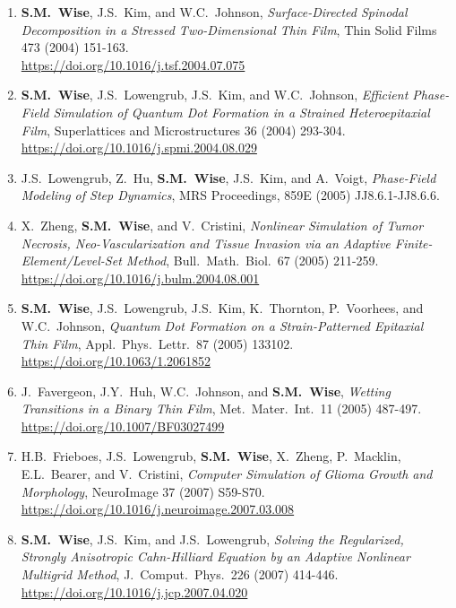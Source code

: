 \documentclass[11pt]{letter}
\begin{document}
\begin{enumerate}
    \item
\textbf{S.M.~Wise}, J.S.~Kim, and W.C.~Johnson, {\sl Surface-Directed Spinodal Decomposition in a Stressed Two-Dimensional Thin Film}, Thin Solid Films 473 (2004) 151-163.
	\\
\url{https://doi.org/10.1016/j.tsf.2004.07.075}

    \item
\textbf{S.M.~Wise}, J.S.~Lowengrub, J.S.~Kim, and W.C.~Johnson, {\sl Efficient Phase-Field Simulation of Quantum Dot Formation in a Strained Heteroepitaxial Film}, Superlattices and Microstructures 36 (2004) 293-304.
	\\
\url{https://doi.org/10.1016/j.spmi.2004.08.029}

    \item
J.S.~Lowengrub, Z.~Hu, \textbf{S.M.~Wise}, J.S.~Kim, and A.~Voigt, {\sl Phase-Field Modeling of Step Dynamics}, MRS Proceedings, 859E (2005) JJ8.6.1-JJ8.6.6.

    \item
X.~Zheng, \textbf{S.M.~Wise}, and V.~Cristini, {\sl Nonlinear Simulation of Tumor Necrosis, Neo-Vascularization and Tissue Invasion via an Adaptive Finite-Element/Level-Set Method}, Bull.~Math.~Biol.~67 (2005) 211-259.
	\\
\url{https://doi.org/10.1016/j.bulm.2004.08.001}

    \item
\textbf{S.M.~Wise}, J.S.~Lowengrub, J.S.~Kim, K.~Thornton, P.~Voorhees, and W.C.~Johnson, {\sl Quantum Dot Formation on a Strain-Patterned Epitaxial Thin Film}, Appl.~Phys.~Lettr.~87 (2005) 133102.
	\\
\url{https://doi.org/10.1063/1.2061852}

	\item
J.~Favergeon, J.Y.~Huh, W.C.~Johnson, and \textbf{S.M.~Wise}, {\sl Wetting Transitions in a Binary Thin Film}, Met.~Mater.~Int.~11 (2005) 487-497.
	\\
\url{https://doi.org/10.1007/BF03027499}

    \item
H.B.~Frieboes, J.S.~Lowengrub, \textbf{S.M.~Wise}, X.~Zheng, P.~Macklin, E.L.~Bearer, and V.~Cristini, {\sl Computer Simulation of Glioma Growth and Morphology}, NeuroImage  37 (2007) S59-S70.
	\\
\url{https://doi.org/10.1016/j.neuroimage.2007.03.008}

    \item
\textbf{S.M.~Wise}, J.S.~Kim, and J.S.~Lowengrub, {\sl Solving the Regularized, Strongly Anisotropic Cahn-Hilliard Equation by an Adaptive Nonlinear Multigrid Method}, J.~Comput.~Phys.~226 (2007) 414-446.
	\\
\url{https://doi.org/10.1016/j.jcp.2007.04.020}


\end{enumerate}
\end{document}
